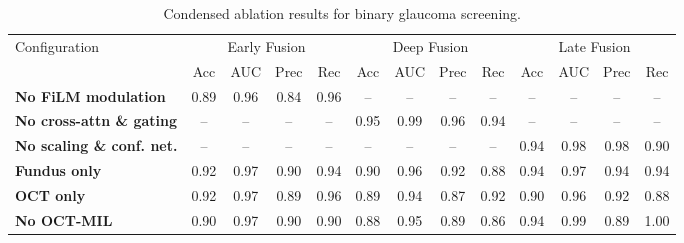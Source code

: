 \documentclass[preprint,12pt]{elsarticle}
\begin{document}
\begin{table}[!t]
    \centering
    \caption{Condensed ablation results for binary glaucoma screening.}
    \label{tab:binary-ablation-condensed}
    \scriptsize
    \setlength{\tabcolsep}{3pt}
    \begin{tabular}{|l|cccc|cccc|cccc|}
        \hline
        \multirow{2}{*}{Configuration}     &
        \multicolumn{4}{c|}{Early Fusion}  &
        \multicolumn{4}{c|}{Deep Fusion}   &
        \multicolumn{4}{c|}{Late Fusion}                                \\
        \cline{2-13}
                                           & Acc  & AUC  & Prec & Rec &
        Acc                                & AUC  & Prec & Rec  &
        Acc                                & AUC  & Prec & Rec          \\
        \hline
        \textbf{No FiLM modulation}        &
        0.89                               & 0.96 & 0.84 & 0.96 &
        --                                 & --   & --   & --   &
        --                                 & --   & --   & --           \\
        \textbf{No cross-attn \& gating}   &
        --                                 & --   & --   & --   &
        0.95                               & 0.99 & 0.96 & 0.94 &
        --                                 & --   & --   & --           \\
        \textbf{No scaling \& conf. net.}  &
        --                                 & --   & --   & --   &
        --                                 & --   & --   & --   &
        0.94                               & 0.98 & 0.98 & 0.90         \\
        \hline
        \textbf{Fundus only}               &
        0.92                               & 0.97 & 0.90 & 0.94 &
        0.90                               & 0.96 & 0.92 & 0.88 &
        0.94                               & 0.97 & 0.94 & 0.94         \\
        \textbf{OCT only}                  &
        0.92                               & 0.97 & 0.89 & 0.96 &
        0.89                               & 0.94 & 0.87 & 0.92 &
        0.90                               & 0.96 & 0.92 & 0.88         \\
        \hline
        \textbf{No OCT-MIL}                &
        0.90                               & 0.97 & 0.90 & 0.90 &
        0.88                               & 0.95 & 0.89 & 0.86 &
        0.94                               & 0.99 & 0.89 & 1.00         \\

\end{tabular}
\end{table}
\end{document}
